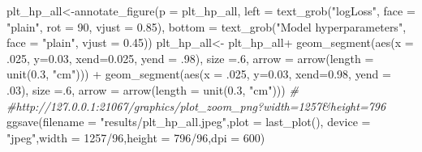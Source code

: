 \documentclass[
]{article}
\newenvironment{Shaded}{\begin{snugshade}}{\end{snugshade}}
\newcommand{\AttributeTok}[1]{\textcolor[rgb]{0.77,0.63,0.00}{#1}}
\newcommand{\CommentTok}[1]{\textcolor[rgb]{0.56,0.35,0.01}{\textit{#1}}}
\newcommand{\DecValTok}[1]{\textcolor[rgb]{0.00,0.00,0.81}{#1}}
\newcommand{\FloatTok}[1]{\textcolor[rgb]{0.00,0.00,0.81}{#1}}
\newcommand{\FunctionTok}[1]{\textcolor[rgb]{0.00,0.00,0.00}{#1}}
\newcommand{\NormalTok}[1]{#1}
\newcommand{\OtherTok}[1]{\textcolor[rgb]{0.56,0.35,0.01}{#1}}
\newcommand{\SpecialCharTok}[1]{\textcolor[rgb]{0.00,0.00,0.00}{#1}}
\newcommand{\StringTok}[1]{\textcolor[rgb]{0.31,0.60,0.02}{#1}}
\begin{document}
\begin{Shaded}
\begin{Highlighting}[]
\NormalTok{plt\_hp\_all}\OtherTok{\textless{}{-}}\FunctionTok{annotate\_figure}\NormalTok{(}\AttributeTok{p =}\NormalTok{ plt\_hp\_all,}
                            \AttributeTok{left =} \FunctionTok{text\_grob}\NormalTok{(}\StringTok{"logLoss"}\NormalTok{, }\AttributeTok{face =} \StringTok{"plain"}\NormalTok{,}
                                             \AttributeTok{rot =} \DecValTok{90}\NormalTok{, }\AttributeTok{vjust =} \FloatTok{0.85}\NormalTok{),}
                            \AttributeTok{bottom =} \FunctionTok{text\_grob}\NormalTok{(}\StringTok{"Model hyperparameters"}\NormalTok{,}
                                               \AttributeTok{face =} \StringTok{"plain"}\NormalTok{, }\AttributeTok{vjust =} \FloatTok{0.45}\NormalTok{))}
\NormalTok{plt\_hp\_all}\OtherTok{\textless{}{-}}\NormalTok{ plt\_hp\_all}\SpecialCharTok{+}
  \FunctionTok{geom\_segment}\NormalTok{(}\FunctionTok{aes}\NormalTok{(}\AttributeTok{x =}\NormalTok{ .}\DecValTok{025}\NormalTok{, }\AttributeTok{y=}\FloatTok{0.03}\NormalTok{, }\AttributeTok{xend=}\FloatTok{0.025}\NormalTok{, }\AttributeTok{yend =}\NormalTok{ .}\DecValTok{98}\NormalTok{), }\AttributeTok{size =}\NormalTok{.}\DecValTok{6}\NormalTok{,}
               \AttributeTok{arrow =} \FunctionTok{arrow}\NormalTok{(}\AttributeTok{length =} \FunctionTok{unit}\NormalTok{(}\FloatTok{0.3}\NormalTok{, }\StringTok{"cm"}\NormalTok{))) }\SpecialCharTok{+}
  \FunctionTok{geom\_segment}\NormalTok{(}\FunctionTok{aes}\NormalTok{(}\AttributeTok{x =}\NormalTok{ .}\DecValTok{025}\NormalTok{, }\AttributeTok{y=}\FloatTok{0.03}\NormalTok{, }\AttributeTok{xend=}\FloatTok{0.98}\NormalTok{, }\AttributeTok{yend =}\NormalTok{ .}\DecValTok{03}\NormalTok{), }\AttributeTok{size =}\NormalTok{.}\DecValTok{6}\NormalTok{,}
               \AttributeTok{arrow =} \FunctionTok{arrow}\NormalTok{(}\AttributeTok{length =} \FunctionTok{unit}\NormalTok{(}\FloatTok{0.3}\NormalTok{, }\StringTok{"cm"}\NormalTok{)))}
\CommentTok{\# \#http://127.0.0.1:21067/graphics/plot\_zoom\_png?width=1257\&height=796}
\FunctionTok{ggsave}\NormalTok{(}\AttributeTok{filename =} \StringTok{"results/plt\_hp\_all.jpeg"}\NormalTok{,}\AttributeTok{plot =} \FunctionTok{last\_plot}\NormalTok{(),}
       \AttributeTok{device =} \StringTok{"jpeg"}\NormalTok{,}\AttributeTok{width =} \DecValTok{1257}\SpecialCharTok{/}\DecValTok{96}\NormalTok{,}\AttributeTok{height =} \DecValTok{796}\SpecialCharTok{/}\DecValTok{96}\NormalTok{,}\AttributeTok{dpi =} \DecValTok{600}\NormalTok{)}


\end{Highlighting}
\end{Shaded}
\end{document}
